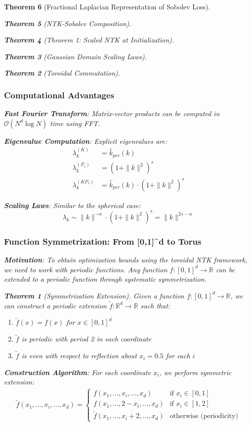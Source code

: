 \documentclass{article}
\newtheorem{theorem}{Theorem}[section]
\begin{document}
\begin{theorem}[Fractional Laplacian Representation of Sobolev Loss]
\begin{theorem}[NTK-Sobolev Composition]
\begin{theorem}[Theorem 1: Scaled NTK at Initialization]
\begin{theorem}[Gaussian Domain Scaling Laws]
\begin{theorem}[Toroidal Commutation]
\subsubsection{Computational Advantages}

\textbf{Fast Fourier Transform}: Matrix-vector products can be computed in $\mathcal{O}(N^d \log N)$ time using FFT.

\textbf{Eigenvalue Computation}: Explicit eigenvalues are:
\begin{align}
\lambda_k^{(K)} &= \hat{k}_{per}(k) \\
\lambda_k^{(P_s)} &= (1 + \|k\|^2)^s \\
\lambda_k^{(KP_s)} &= \hat{k}_{per}(k) \cdot (1 + \|k\|^2)^s
\end{align}

\textbf{Scaling Laws}: Similar to the spherical case:
\[ \lambda_k \sim \|k\|^{-\alpha} \cdot (1 + \|k\|^2)^s = \|k\|^{2s-\alpha} \]

\subsubsection{Function Symmetrization: From [0,1]^d to Torus}

\textbf{Motivation}: To obtain optimization bounds using the toroidal NTK framework, we need to work with periodic functions. Any function $f: [0,1]^d \to \mathbb{R}$ can be extended to a periodic function through systematic symmetrization.

\begin{theorem}[Symmetrization Extension]
Given a function $f: [0,1]^d \to \mathbb{R}$, we can construct a periodic extension $\tilde{f}: \mathbb{R}^d \to \mathbb{R}$ such that:
\begin{enumerate}
\item $\tilde{f}(x) = f(x)$ for $x \in [0,1]^d$
\item $\tilde{f}$ is periodic with period 2 in each coordinate
\item $\tilde{f}$ is even with respect to reflection about $x_i = 0.5$ for each $i$
\end{enumerate}
\end{theorem}

\textbf{Construction Algorithm}:
For each coordinate $x_i$, we perform symmetric extension:
\begin{align}
\tilde{f}(x_1, \ldots, x_i, \ldots, x_d) = \begin{cases}
f(x_1, \ldots, x_i, \ldots, x_d) & \text{if } x_i \in [0,1] \\
f(x_1, \ldots, 2-x_i, \ldots, x_d) & \text{if } x_i \in [1,2] \\
\tilde{f}(x_1, \ldots, x_i + 2, \ldots, x_d) & \text{otherwise (periodicity)}
\end{cases}
\end{align}


\end{theorem}
\end{theorem}
\end{theorem}
\end{theorem}
\end{theorem}
\end{document}
